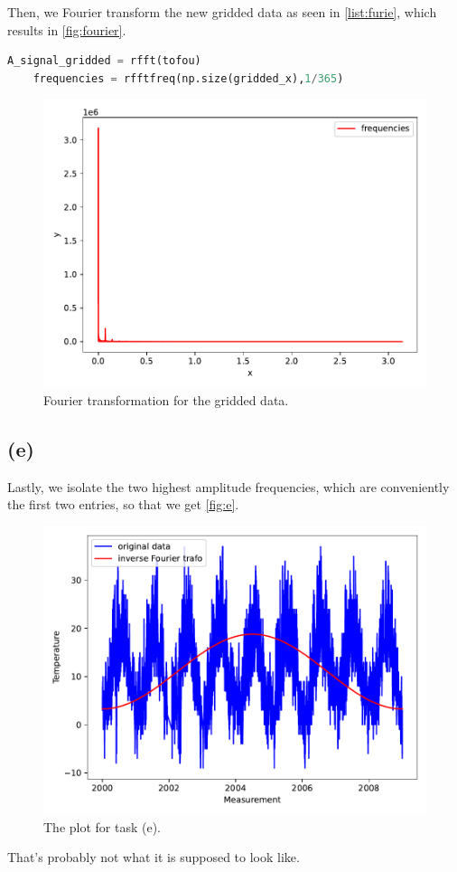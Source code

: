 Then, we Fourier transform the new gridded data as seen in \autoref{list:furie}, which results in \autoref{fig:fourier}.

\begin{lstlisting}[language = Python, caption={Implementation of the Fourier transformation.}, label = {list:furie}]
    A_signal_gridded = rfft(tofou)
    frequencies = rfftfreq(np.size(gridded_x),1/365)
\end{lstlisting}

\begin{figure}[H]
    \centering
    \includegraphics{plots/furie.pdf}
    \caption{Fourier transformation for the gridded data.}
    \label{fig:fourier}
\end{figure}

\subsection*{(e)}

Lastly, we isolate the two highest amplitude frequencies, which are conveniently the first two entries, so that we get \autoref{fig:e}.

\begin{figure}
    \centering
    \includegraphics{plots/e.pdf}
    \caption{The plot for task (e).}
    \label{fig:e}
\end{figure}

That's probably not what it is supposed to look like.